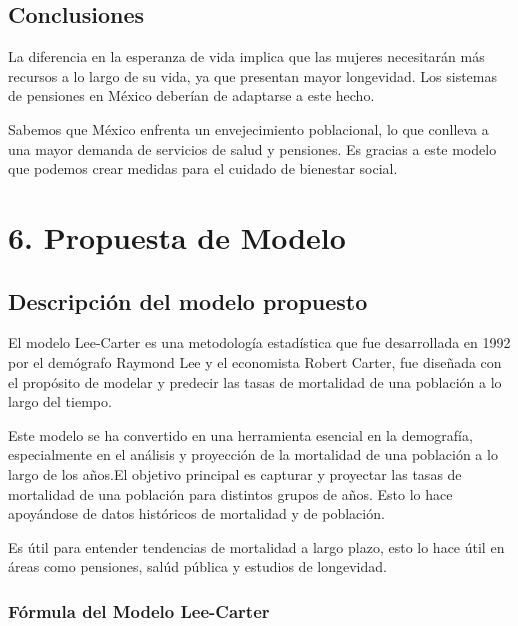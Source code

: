 \documentclass[
]{article}
\begin{document}
\clearpage

\hypertarget{conclusiones}{%
\subsection{Conclusiones}\label{conclusiones}}

La diferencia en la esperanza de vida implica que las mujeres
necesitarán más recursos a lo largo de su vida, ya que presentan mayor
longevidad. Los sistemas de pensiones en México deberían de adaptarse a
este hecho.

Sabemos que México enfrenta un envejecimiento poblacional, lo que
conlleva a una mayor demanda de servicios de salud y pensiones. Es
gracias a este modelo que podemos crear medidas para el cuidado de
bienestar social.

\clearpage

\hypertarget{propuesta-de-modelo}{%
\section{6. Propuesta de Modelo}\label{propuesta-de-modelo}}

\hypertarget{descripciuxf3n-del-modelo-propuesto}{%
\subsection{Descripción del modelo
propuesto}\label{descripciuxf3n-del-modelo-propuesto}}

El modelo Lee-Carter es una metodología estadística que fue desarrollada
en 1992 por el demógrafo Raymond Lee y el economista Robert Carter, fue
diseñada con el propósito de modelar y predecir las tasas de mortalidad
de una población a lo largo del tiempo.

Este modelo se ha convertido en una herramienta esencial en la
demografía, especialmente en el análisis y proyección de la mortalidad
de una población a lo largo de los años.El objetivo principal es
capturar y proyectar las tasas de mortalidad de una población para
distintos grupos de años. Esto lo hace apoyándose de datos históricos de
mortalidad y de población.

Es útil para entender tendencias de mortalidad a largo plazo, esto lo
hace útil en áreas como pensiones, salúd pública y estudios de
longevidad.

\hypertarget{fuxf3rmula-del-modelo-lee-carter}{%
\subsubsection{Fórmula del Modelo
Lee-Carter}\label{fuxf3rmula-del-modelo-lee-carter}}
\end{document}
